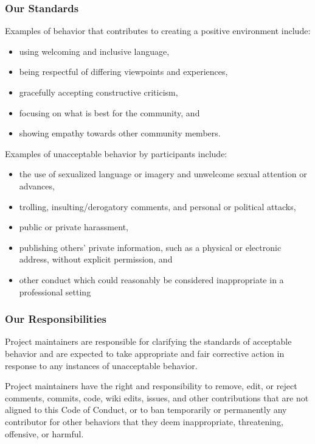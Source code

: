 \subsubsection{Our Standards}\label{s:conduct-standards}

Examples of behavior that contributes to creating a positive environment
include:

\begin{itemize}
\tightlist
\item
  using welcoming and inclusive language,
\item
  being respectful of differing viewpoints and experiences,
\item
  gracefully accepting constructive criticism,
\item
  focusing on what is best for the community, and
\item
  showing empathy towards other community members.
\end{itemize}

Examples of unacceptable behavior by participants include:

\begin{itemize}
\tightlist
\item
  the use of sexualized language or imagery and unwelcome sexual
  attention or advances,
\item
  trolling, insulting/derogatory comments, and personal or political
  attacks,
\item
  public or private harassment,
\item
  publishing others' private information, such as a physical or
  electronic address, without explicit permission, and
\item
  other conduct which could reasonably be considered inappropriate in a
  professional setting
\end{itemize}

\subsubsection{Our Responsibilities}\label{s:conduct-responsibilities}

Project maintainers are responsible for clarifying the standards of
acceptable behavior and are expected to take appropriate and fair
corrective action in response to any instances of unacceptable behavior.

Project maintainers have the right and responsibility to remove, edit,
or reject comments, commits, code, wiki edits, issues, and other
contributions that are not aligned to this Code of Conduct, or to ban
temporarily or permanently any contributor for other behaviors that they
deem inappropriate, threatening, offensive, or harmful.

